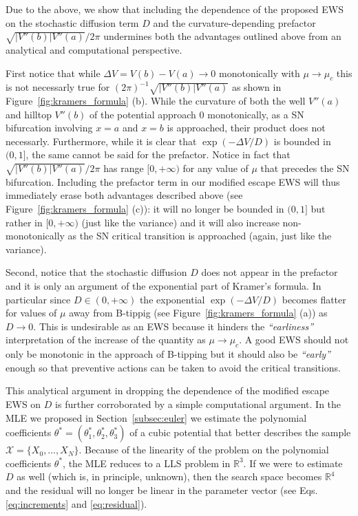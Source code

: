 \documentclass[10pt]{article}
\newcommand{\sref}[1]{Section~\ref{#1}}
\newcommand{\fref}[1]{Figure~\ref{#1}}
\begin{document}
Due to the above, we show that including the dependence of the proposed EWS on the stochastic diffusion term $D$ and the curvature-depending prefactor $\sqrt{|V''(b)|V''(a)}/2\pi$ undermines both the advantages outlined above from an analytical and computational perspective.

First notice that while $\Delta V = V(b) - V(a)\to0$ monotonically with $\mu\to\mu_c$ this is not necessarly true for $(2\pi)^{-1}\sqrt{|V''(b)|V''(a)}$ as shown in \fref{fig:kramers_formula} (b).
While the curvature of both the well $V''(a)$ and hilltop $V''(b)$ of the potential approach $0$ monotonically, as a SN bifurcation involving $x=a$ and $x=b$ is approached, their product does not necessarly.
Furthermore, while it is clear that $\exp(-\Delta V/D)$ is bounded in $(0,1]$, the same cannot be said for the prefactor.
Notice in fact that $\sqrt{|V''(b)|V''(a)}/2\pi$ has range $[0,+\infty)$ for any value of $\mu$ that precedes the SN bifurcation.
Including the prefactor term in our modified escape EWS will thus immediately erase both advantages described above (see \fref{fig:kramers_formula} (c)): it will no longer be bounded in $(0,1]$ but rather in $[0,+\infty)$ (just like the variance) and it will also increase non-monotonically as the SN critical transition is approached (again, just like the variance).

Second, notice that the stochastic diffusion $D$ does not appear in the prefactor and it is only an argument of the exponential part of Kramer's formula.
In particular since $D\in(0,+\infty)$ the exponential $\exp(-\Delta V/D)$ becomes flatter for values of $\mu$ away from B-tippig (see \fref{fig:kramers_formula} (a)) as $D\to0$.
This is undesirable as an EWS because it hinders the \textit{``earliness''} interpretation of the increase of the quantity as $\mu\to\mu_c$.
A good EWS should not only be monotonic in the approach of B-tipping but it should also be \textit{``early''} enough so that preventive actions can be taken to avoid the critical transitions.

This analytical argument in dropping the dependence of the modified escape EWS on $D$ is further corroborated by a simple computational argument.
In the MLE we proposed in \sref{subsec:euler} we estimate the polynomial coefficients $\theta^* = (\theta_1^*,\theta_2^*,\theta_3^*)$ of a cubic potential that better describes the sample $\mathcal{X}=\{X_0,\dots,X_N\}$.
Because of the linearity of the problem on the polynomial coefficients $\theta^*$, the MLE reduces to a LLS problem in $\mathbb{R}^{3}$.
If we were to estimate $D$ as well (which is, in principle, unknown), then the search space becomes $\mathbb{R}^{4}$ and the residual will no longer be linear in the parameter vector (see Eqs. \eqref{eq:increments} and \eqref{eq:residual}).
\end{document}
